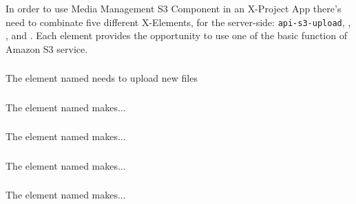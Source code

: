 In order to use Media Management S3 Component in an X-Project App there's need to combinate five different X-Elements, for the server-side: \texttt{api-s3-upload}, , ,  and .
Each element provides the opportunity to use one of the basic function of Amazon S3 service. 

\subsubsection{}
\label{api-s3-upload}
The element named  needs to upload new files 

\subsubsection{}
\label{api-s3-list}
The element named  makes...

\subsubsection{}
\label{api-s3-delete}
The element named  makes...

\subsubsection{}
\label{part-s3-list}
The element named  makes...

\subsubsection{}
\label{part-s3-upload}
The element named  makes...



